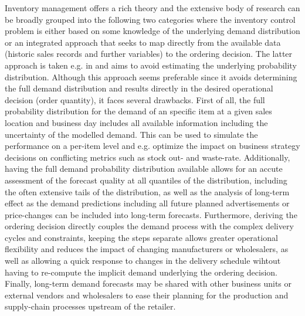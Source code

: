 \documentclass[BCOR=1mm, DIV=calc,10pt,
twoside=true,
twocolumn,
headings=normal]{scrartcl}
\begin{document}
Inventory management offers a rich theory and the extensive body of research can be
broadly grouped into the following two categories where the inventory control problem is
either based on some knowledge of the underlying demand  distribution or an integrated
approach that seeks to map directly from the available data (historic sales records and 
further variables) to the ordering decision. The latter approach is taken e.g. in
\cite{beutel2012safety,ban2019big,bertsimas2020predictive} and aims to avoid estimating
the underlying probability distribution. Although this approach seems preferable since it
avoids determining the full demand distribution and results directly in the desired
operational decision (order quantity), it faces several drawbacks. First of all, the full
probability distribution for the demand of an specific item at a given sales location and
business day includes all available information including the uncertainty of the modelled
demand. This can be used to simulate the performance on a per-item level and e.g. optimize
the impact on business strategy decisions on conflicting metrics such as stock out- and
waste-rate. Additionally, having the full demand probability distribution available allows
for an accute assessment of the forecast quality at all quantiles of the distribution,
including the often extensive tails of the distribution, as well as the analysis of
long-term  effect as the demand predictions including all future planned advertisements or
price-changes can be included into long-term forecasts. Furthermore, deriving the ordering
decision  directly couples the demand process with the complex delivery cycles and
constraints, keeping the steps separate allows greater operational flexibility and reduces
the impact of changing manufacturers or wholesalers, as well as  allowing a quick response
to changes in the delivery schedule wihtout having to re-compute the implicit demand
underlying the ordering decision. Finally, long-term demand forecasts may be shared with
other business units or external vendors  and wholesalers to ease their planning for the
production and supply-chain processes upstream of the retailer.
\end{document}
